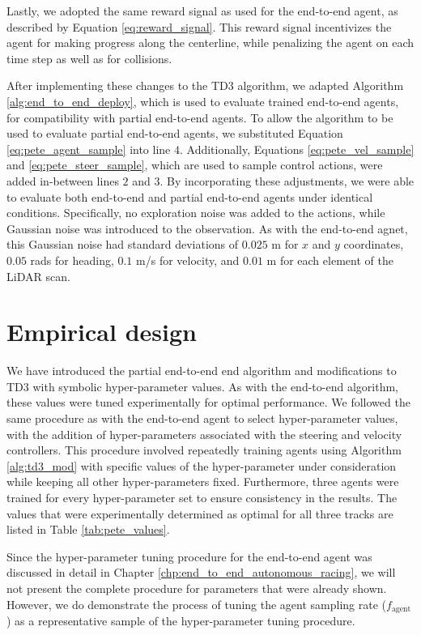 Lastly, we adopted the same reward signal as used for the end-to-end agent, as described by Equation \ref{eq:reward_signal}. 
This reward signal incentivizes the agent for making progress along the centerline, while penalizing the agent on each time step as well as for collisions.


After implementing these changes to the TD3 algorithm, we adapted Algorithm \ref{alg:end_to_end_deploy}, which is used to evaluate trained end-to-end agents, for compatibility with partial end-to-end agents.
To allow the algorithm to be used to evaluate partial end-to-end agents, we substituted Equation \ref{eq:pete_agent_sample} into line $4$.
Additionally, Equations \ref{eq:pete_vel_sample} and \ref{eq:pete_steer_sample}, which are used to sample control actions, were added in-between lines $2$ and $3$.
By incorporating these adjustments, we were able to evaluate both end-to-end and partial end-to-end agents under identical conditions. 
Specifically, no exploration noise was added to the actions, while Gaussian noise was introduced to the observation.
As with the end-to-end agnet, this Gaussian noise had standard deviations of $0.025$ m for $x$ and $y$ coordinates, $0.05$ rads for heading, $0.1$ m/s for velocity, and $0.01$ m for each element of the LiDAR scan. 

\section{Empirical design}

We have introduced the partial end-to-end end algorithm and modifications to TD3 with symbolic hyper-parameter values.
As with the end-to-end algorithm, these values were tuned experimentally for optimal performance.
We followed the same procedure as with the end-to-end agent to select hyper-parameter values, with the addition of hyper-parameters associated with the steering and velocity controllers.
This procedure involved repeatedly training agents using Algorithm \ref{alg:td3_mod} with specific values of the hyper-parameter under consideration while keeping all other hyper-parameters fixed.
Furthermore, three agents were trained for every hyper-parameter set to ensure consistency in the results.
The values that were experimentally determined as optimal for all three tracks are listed in Table \ref{tab:pete_values}.




Since the hyper-parameter tuning procedure for the end-to-end agent was discussed in detail in Chapter \ref{chp:end_to_end_autonomous_racing}, we will not present the complete procedure for parameters that were already shown. 
However, we do demonstrate the process of tuning the agent sampling rate ($f_{\text{agent}}$) as a representative sample of the hyper-parameter tuning procedure.

